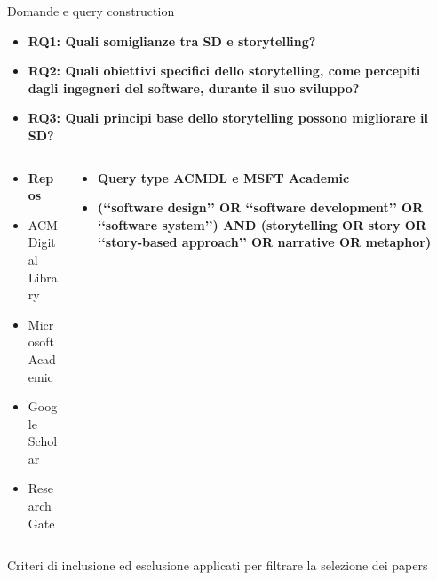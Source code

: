 \documentclass{beamer}
\begin{document}
\begin{frame}[t]
{\centerline{Domande e query construction}}
      \begin{minipage}{\linewidth}
\begin{itemize}[itemsep=1\baselineskip]
    \item {\fontsize{8}{12}\textbf{\textcolor{myred}{RQ1}: Quali somiglianze tra SD e storytelling?}}
    \item {\fontsize{8}{12}\textbf{\textcolor{myred}{RQ2}: Quali obiettivi specifici dello storytelling, come percepiti dagli ingegneri del software, durante il suo sviluppo?}}
    \item {\fontsize{8}{12}\textbf{\textcolor{myred}{RQ3}: Quali principi base dello storytelling possono migliorare il SD?}}
\end{itemize}

  \begin{columns}
        \begin{column}{0.4\textwidth}
            \begin{itemize}
                \item  {\fontsize{10}{10}\textbf{\textcolor{myyellow}{Repos}}}
                \item ACM Digital Library
                \item Microsoft Academic
                \item Google Scholar
                \item Research Gate
            \end{itemize}
        \end{column}
        \begin{column}{0.6\textwidth}
            \raggedleft
            \begin{itemize}
                \item  {\fontsize{6}{6}\textbf{\textcolor{myyellow}{Query type ACMDL e MSFT Academic}}}
                \item {\fontsize{6}{6}\textbf{(‘‘software design’’ OR ‘‘software development’’ OR ‘‘software
system’’)
AND
(storytelling OR story OR ‘‘story-based approach’’ OR
narrative OR metaphor)}}
                
            \end{itemize}
        \end{column}
    \end{columns}
    \vspace{0.5cm}
Criteri di inclusione ed esclusione applicati per filtrare la selezione dei papers \cite{patino_ferreira_2018}
      \end{minipage}
\end{frame}
\end{document}
